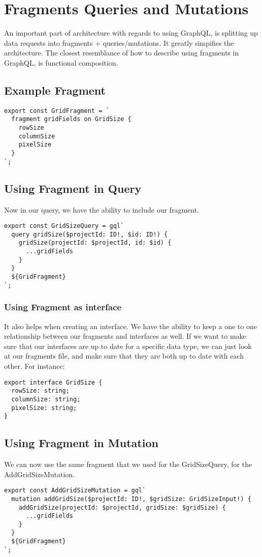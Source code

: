 
\section{ Fragments Queries and Mutations }

An important part of architecture with regards to using GraphQL, is splitting
up data requests into fragments + queries/mutations. It greatly simpifies
the architecture. The closest resemblance of how to describe using fragments
in GraphQL, is functional composition.



\subsection{ Example Fragment }
\begin{verbatim}
export const GridFragment = `
  fragment gridFields on GridSize {
    rowSize
    columnSize
    pixelSize
  }
`;
\end{verbatim}

\subsection{ Using Fragment in Query }
Now in our query, we have the ability to include our fragment.
\begin{verbatim}
export const GridSizeQuery = gql`
  query gridSize($projectId: ID!, $id: ID!) {
    gridSize(projectId: $projectId, id: $id) {
      ...gridFields
    }
  }
  ${GridFragment}
`;
\end{verbatim}

\subsubsection{ Using Fragment as interface }
It also helps when creating an interface. We have the ability to keep a one to
one relationship between our fragments and interfaces as well. If we want to
make sure that our interfaces are up to date for a specific data type, we can
just look at our fragments file, and make sure that they are both up to date
with each other. For instance:
\begin{lstlisting}
export interface GridSize {
  rowSize: string;
  columnSize: string;
  pixelSize: string;
}
\end{lstlisting}

\subsection{ Using Fragment in Mutation }
We can now use the same fragment that we used for the GridSizeQuery, for the
AddGridSizeMutation.

\begin{lstlisting}
export const AddGridSizeMutation = gql`
  mutation addGridSize($projectId: ID!, $gridSize: GridSizeInput!) {
    addGridSize(projectId: $projectId, gridSize: $gridSize) {
      ...gridFields
    }
  }
  ${GridFragment}
`;
\end{lstlisting}
